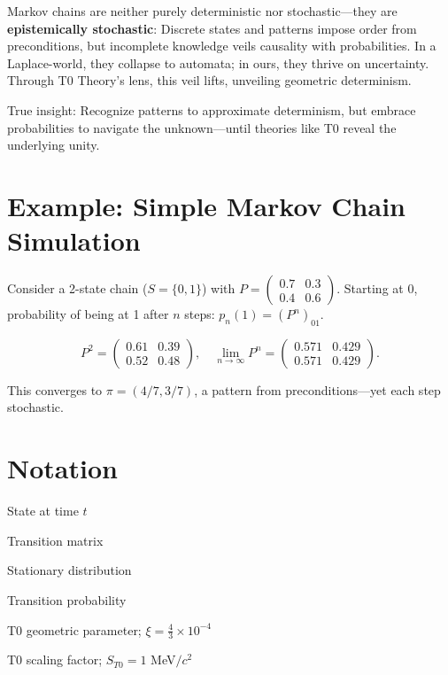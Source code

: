 \documentclass[12pt,a4paper]{article}
\begin{document}
	Markov chains are neither purely deterministic nor stochastic—they are \textbf{epistemically stochastic}: Discrete states and patterns impose order from preconditions, but incomplete knowledge veils causality with probabilities. In a Laplace-world, they collapse to automata; in ours, they thrive on uncertainty. Through T0 Theory's lens, this veil lifts, unveiling geometric determinism.
	
	True insight: Recognize patterns to approximate determinism, but embrace probabilities to navigate the unknown—until theories like T0 reveal the underlying unity.
	
	\appendix
	\section{Example: Simple Markov Chain Simulation}
	
	Consider a 2-state chain ($S = \{0,1\}$) with $P = \begin{pmatrix} 0.7 & 0.3 \\ 0.4 & 0.6 \end{pmatrix}$. Starting at 0, probability of being at 1 after $n$ steps: $p_n(1) = (P^n)_{01}$.
	
	\begin{equation}
		P^2 = \begin{pmatrix} 0.61 & 0.39 \\ 0.52 & 0.48 \end{pmatrix}, \quad \lim_{n\to\infty} P^n = \begin{pmatrix} 0.571 & 0.429 \\ 0.571 & 0.429 \end{pmatrix}.
	\end{equation}
	
	This converges to $\pi = (4/7, 3/7)$, a pattern from preconditions—yet each step stochastic.
	
	\section{Notation}
	
	\begin{description}[leftmargin=1cm]
		\item[$X_t$] State at time $t$
		\item[$P$] Transition matrix
		\item[$\pi$] Stationary distribution
		\item[$p_{ij}$] Transition probability
		\item[$\xi$] T0 geometric parameter; $\xi = \frac{4}{3} \times 10^{-4}$
		\item[$S_{T0}$] T0 scaling factor; $S_{T0} = 1$ MeV$/c^2$
	\end{description}
	
\end{document}
